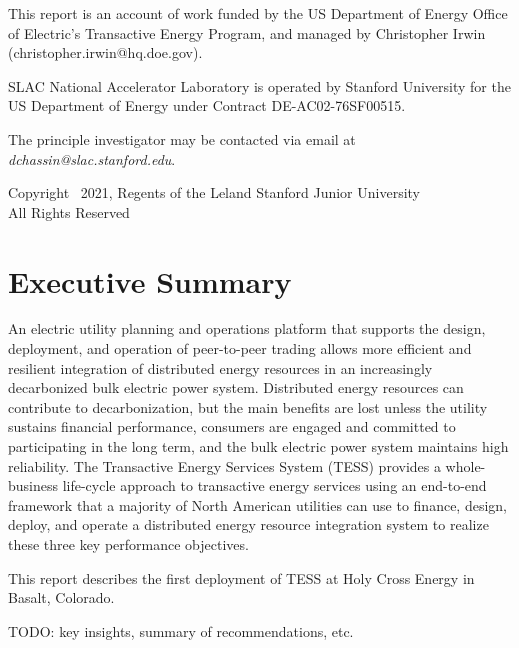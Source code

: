 
\noindent This report is an account of work funded by the US Department of Energy Office of Electric's Transactive Energy Program, and managed by Christopher Irwin (christopher.irwin@hq.doe.gov).

\vspace{0.25in}

\noindent SLAC National Accelerator Laboratory is operated by Stanford University for the US Department of Energy under Contract DE-AC02-76SF00515.

\vspace{0.25in}

\noindent The principle investigator may be contacted via email at \textit{dchassin@slac.stanford.edu}.

\vspace{5in}

\noindent Copyright \textcopyright \ 2021, Regents of the Leland Stanford Junior University \\ All Rights Reserved

\newpage

\section*{Executive Summary}

    An electric utility planning and operations platform that supports the design, deployment, and operation of peer-to-peer trading allows more efficient and resilient integration of distributed energy resources in an increasingly decarbonized bulk electric power system. Distributed energy resources can contribute to decarbonization, but the main benefits are lost unless the utility sustains financial performance, consumers are engaged and committed to participating in the long term, and the bulk electric power system maintains high reliability. The Transactive Energy Services System (TESS) provides a whole-business life-cycle approach to transactive energy services using an end-to-end framework that a majority of North American utilities can use to finance, design, deploy, and operate a distributed energy resource integration system to realize these three key performance objectives. 

    This report describes the first deployment of TESS at Holy Cross Energy in Basalt, Colorado.
    
    TODO: key insights, summary of recommendations, etc.
